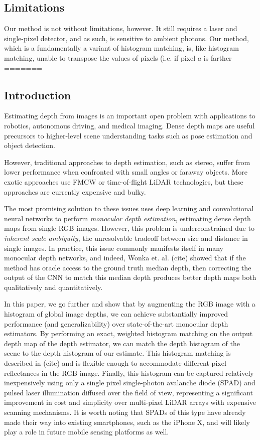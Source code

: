 \subsection{Limitations}
Our method is not without limitations, however. It still requires a laser and
single-pixel detector, and as such, is sensitive to ambient photons. Our method,
which is a fundamentally a variant of histogram matching, is, like histogram
matching, unable to transpose the values of pixels (i.e. if pixel $a$ is farther
=======
\subsection{Introduction}
Estimating depth from images is an important open problem with applications
to robotics, autonomous driving, and medical imaging. Dense depth maps are
useful precursors to higher-level scene understanding tasks such as pose
estimation and object detection.

However, traditional approaches to depth estimation, such as stereo, suffer from lower performance
when confronted with small angles or faraway objects.
More exotic approaches use FMCW or time-of-flight LiDAR technologies,
but these approaches are currently expensive and bulky. 

The most promising solution to these issues uses deep learning and 
convolutional neural networks to perform \textit{monocular depth estimation},
estimating dense depth maps from single RGB images. 
However, this problem is underconstrained due to \textit{inherent scale ambiguity}, the unresolvable
tradeoff between size and distance in single images. In practice, this issue commonly
manifests itself in many monocular depth networks, and indeed, 
Wonka et. al. (cite) showed that if the method has oracle access to the ground truth
median depth, then correcting the output of the CNN to match this median
depth produces better depth maps both qualitatively and quantitatively.

In this paper, we go further and show that by augmenting the RGB image with a histogram of
global image depths, we can achieve substantially improved performance
(and generalizability) over state-of-the-art monocular depth
estimators. By performing an exact, weighted histogram matching on the output
depth map of the depth estimator, we can match the depth histogram of the scene
to the depth histogram of our estimate. This histogram matching is described in
(cite) and is flexible enough to accommodate different pixel reflectances in the
RGB image. Finally, this histogram can be captured
relatively inexpensively using only a single pixel single-photon avalanche diode
(SPAD) and pulsed laser illumination diffused over the field of view, 
representing a significant improvement in cost and simplicity over multi-pixel LiDAR
arrays with expensive scanning mechanisms. It is
worth noting that SPADs of this type have already made their way into existing
smartphones, such as the iPhone X, and will likely play a role in future mobile sensing platforms as well.

